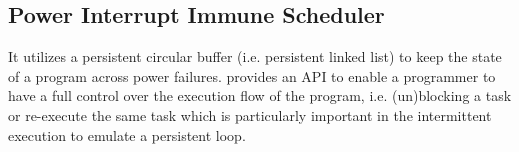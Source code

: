 \subsection{Power Interrupt Immune Scheduler}


It utilizes a persistent circular buffer (i.e. persistent linked list) to keep the state of a program across power failures. \sys provides an API to enable a programmer to have a full control over the execution flow of the program, i.e. (un)blocking a task or re-execute the same task which is particularly important in the intermittent execution to emulate a persistent loop. 

%		
%		
